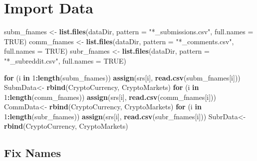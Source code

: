 \documentclass[
]{book}
\newenvironment{Shaded}{\begin{snugshade}}{\end{snugshade}}
\newcommand{\ControlFlowTok}[1]{\textcolor[rgb]{0.13,0.29,0.53}{\textbf{#1}}}
\newcommand{\DataTypeTok}[1]{\textcolor[rgb]{0.13,0.29,0.53}{#1}}
\newcommand{\DecValTok}[1]{\textcolor[rgb]{0.00,0.00,0.81}{#1}}
\newcommand{\KeywordTok}[1]{\textcolor[rgb]{0.13,0.29,0.53}{\textbf{#1}}}
\newcommand{\NormalTok}[1]{#1}
\newcommand{\OperatorTok}[1]{\textcolor[rgb]{0.81,0.36,0.00}{\textbf{#1}}}
\newcommand{\OtherTok}[1]{\textcolor[rgb]{0.56,0.35,0.01}{#1}}
\newcommand{\StringTok}[1]{\textcolor[rgb]{0.31,0.60,0.02}{#1}}
\begin{document}
\hypertarget{import-data}{%
\section{Import Data}\label{import-data}}

\begin{Shaded}
\begin{Highlighting}[]
\NormalTok{subm_fnames <-}\StringTok{ }\KeywordTok{list.files}\NormalTok{(dataDir, }\DataTypeTok{pattern =} \StringTok{"*_submissions.csv"}\NormalTok{, }\DataTypeTok{full.names =} \OtherTok{TRUE}\NormalTok{)}
\NormalTok{comm_fnames <-}\StringTok{ }\KeywordTok{list.files}\NormalTok{(dataDir, }\DataTypeTok{pattern =} \StringTok{"*_comments.csv"}\NormalTok{, }\DataTypeTok{full.names =} \OtherTok{TRUE}\NormalTok{)}
\NormalTok{subr_fnames <-}\StringTok{ }\KeywordTok{list.files}\NormalTok{(dataDir, }\DataTypeTok{pattern =} \StringTok{"*_subreddit.csv"}\NormalTok{, }\DataTypeTok{full.names =} \OtherTok{TRUE}\NormalTok{)}

\ControlFlowTok{for}\NormalTok{ (i }\ControlFlowTok{in} \DecValTok{1}\OperatorTok{:}\KeywordTok{length}\NormalTok{(subm_fnames)) }
  \KeywordTok{assign}\NormalTok{(srs[i], }\KeywordTok{read.csv}\NormalTok{(subm_fnames[i]))}
\NormalTok{SubmData<-}\StringTok{ }\KeywordTok{rbind}\NormalTok{(CryptoCurrency, CryptoMarkets)}
\ControlFlowTok{for}\NormalTok{ (i }\ControlFlowTok{in} \DecValTok{1}\OperatorTok{:}\KeywordTok{length}\NormalTok{(comm_fnames)) }
  \KeywordTok{assign}\NormalTok{(srs[i], }\KeywordTok{read.csv}\NormalTok{(comm_fnames[i]))}
\NormalTok{CommData<-}\StringTok{ }\KeywordTok{rbind}\NormalTok{(CryptoCurrency, CryptoMarkets)}
\ControlFlowTok{for}\NormalTok{ (i }\ControlFlowTok{in} \DecValTok{1}\OperatorTok{:}\KeywordTok{length}\NormalTok{(subr_fnames)) }
  \KeywordTok{assign}\NormalTok{(srs[i], }\KeywordTok{read.csv}\NormalTok{(subr_fnames[i]))}
\NormalTok{SubrData<-}\StringTok{ }\KeywordTok{rbind}\NormalTok{(CryptoCurrency, CryptoMarkets)}
\end{Highlighting}
\end{Shaded}

\hypertarget{fix-names}{%
\subsection{Fix Names}\label{fix-names}}
\end{document}
